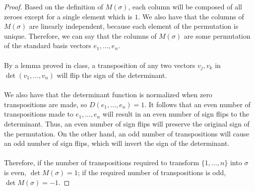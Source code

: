 \documentclass[12pt,reqno]{article}
\theoremstyle{definition}
\begin{document}
\begin{proof}
    Based on the definition of $M(\sigma)$, each column will be composed of all zeroes except for a single element which is $1$. We also have that the columns of $M(\sigma)$ are linearly independent, because each element of the permutation is unique. Therefore, we can say that the columns of $M(\sigma)$ are some permutation of the standard basis vectors $e_1,\ldots,e_n$.
    \\\\
    By a lemma proved in class, a transposition of any two vectors $v_j,v_k$ in $\det(v_1,\ldots,v_n)$ will flip the sign of the determinant. 
    \\\\
    We also have that the determinant function is normalized when zero transpositions are made, so $D(e_1,\ldots,e_n)=1$. It follows that an even number of transpositions made to $e_1,\ldots,e_n$ will result in an even number of sign flips to the determinant. Thus, an even number of sign flips will preserve the original sign of the permutation. On the other hand, an odd number of transpositions will cause an odd number of sign flips, which will invert the sign of the determinant.
    \\\\
    Therefore, if the number of transpositions required to transform $\{1,\ldots,n\}$ into $\sigma$ is even, $\det M(\sigma) = 1$; if the required number of transpositions is odd, $\det M(\sigma) = -1$.
\end{proof}
\end{document}
